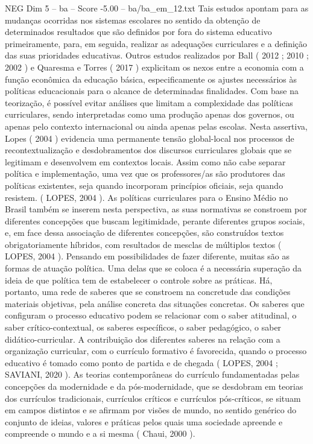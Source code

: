 \begin{textsample}{NEG Dim 5 – ba – Score -5.00 – ba/ba\_em\_12.txt}
Tais estudos apontam para as mudanças ocorridas nos sistemas escolares no sentido da obtenção de determinados resultados que são definidos por fora do sistema educativo primeiramente, para, em seguida, realizar as adequações curriculares e a definição das suas prioridades educativas.
Outros estudos realizados por Ball ( 2012 ; 2010 ; 2002 ) e Quaresma e Torres ( 2017 ) explicitam os nexos entre a economia com a função econômica da educação básica, especificamente os ajustes necessários às políticas educacionais para o alcance de determinadas finalidades.
Com base na teorização, é possível evitar análises que limitam a complexidade das políticas curriculares, sendo interpretadas como uma produção apenas dos governos, ou apenas pelo contexto internacional ou ainda apenas pelas escolas.
Nesta assertiva, Lopes ( 2004 ) evidencia uma permanente tensão global-local nos processos de recontextualização e desdobramentos dos discursos curriculares globais que se legitimam e desenvolvem em contextos locais.
Assim como não cabe separar política e implementação, uma vez que os professores/as são produtores das políticas existentes, seja quando incorporam princípios oficiais, seja quando resistem. ( LOPES, 2004 ).
As políticas curriculares para o Ensino Médio no Brasil também se inserem nesta perspectiva, as suas normativas se constroem por diferentes concepções que buscam legitimidade, perante diferentes grupos sociais, e, em face dessa associação de diferentes concepções, são construídos textos obrigatoriamente híbridos, com resultados de mesclas de múltiplos textos ( LOPES, 2004 ).
Pensando em possibilidades de fazer diferente, muitas são as formas de atuação política.
Uma delas que se coloca é a necessária superação da ideia de que política tem de estabelecer o controle sobre as práticas.
Há, portanto, uma rede de saberes que se constroem na concretude das condições materiais objetivas, pela análise concreta das situações concretas.
Os saberes que configuram o processo educativo podem se relacionar com o saber atitudinal, o saber crítico-contextual, os saberes específicos, o saber pedagógico, o saber didático-curricular.
A contribuição dos diferentes saberes na relação com a organização curricular, com o currículo formativo é favorecida, quando o processo educativo é tomado como ponto de partida e de chegada ( LOPES, 2004 ; SAVIANI, 2020 ).
As teorias contemporâneas do currículo fundamentadas pelas concepções da modernidade e da pós-modernidade, que se desdobram em teorias dos currículos tradicionais, currículos críticos e currículos pós-críticos, se situam em campos distintos e se afirmam por visões de mundo, no sentido genérico do conjunto de ideias, valores e práticas pelos quais uma sociedade apreende e compreende o mundo e a si mesma ( Chaui, 2000 ).

\end{textsample}
